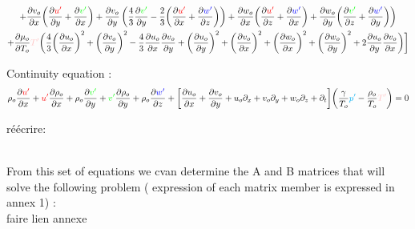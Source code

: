 \documentclass[ border=0pt, a4paper, 11pt]{article}
\numberwithin{equation}{section}
\numberwithin{equation}{section}
\renewcommand{\u}{\textcolor{red}{u'}}
\renewcommand{\v}{\textcolor{green}{v'}}
\newcommand{\w}{\textcolor{blue}{w'}}
\newcommand{\p}{\textcolor{cyan}{p'}}
\newcommand{\T}{\textcolor{pink}{T'}}
\begin{document}
\begin{multline}
 + \frac{\partial v_o}{\partial x} \bigg( \frac{\partial \u }{\partial y} + \frac{\partial \v }{\partial x} \bigg) + \frac{\partial v_o}{\partial y}\left(\frac{4}{3}\frac{\partial \v }{\partial y}-\frac{2}{3} \bigg(\frac{\partial \u }{\partial x}+\frac{\partial \w }{\partial z}\bigg)\right) 
 + \frac{\partial w_o}{\partial x} \bigg( \frac{\partial \u }{\partial z} + \frac{\partial \w }{\partial x} \bigg) + \frac{\partial w_o}{\partial y} \bigg( \frac{\partial \v }{\partial z} + \frac{\partial \w }{\partial y} \bigg)\bigg)\\
 + \frac{\partial  \mu_o }{\partial T_o} \T \bigg( \frac{4}{3}\bigg(\frac{\partial  u_o }{\partial x} \bigg)^2 + \bigg(\frac{\partial  v_o }{\partial y} \bigg)^2 - \frac{4}{3}\frac{\partial  u_o }{\partial x}\frac{\partial  v_o }{\partial y} + \bigg(\frac{\partial  u_o }{\partial y} \bigg)^2 + \bigg(\frac{\partial  v_o }{\partial x} \bigg)^2 + \bigg(\frac{\partial  w_o }{\partial x} \bigg)^2 + \bigg(\frac{\partial w_o }{\partial y} \bigg)^2 + 2 \frac{\partial  u_o }{\partial y}\frac{\partial  v_o }{\partial x}  \bigg) \bigg]\\
       \label{energy}
\end{multline}

Continuity equation :
  \begin{equation}  
 \rho_o\frac{\partial \u }{\partial x} + \u \frac{\partial \rho_o}{\partial x} + \rho_o\frac{\partial \v }{\partial y} + \v \frac{\partial \rho_o}{\partial y} + \rho_o\frac{\partial \w }{\partial z} +
%
\bigg[ \frac{\partial u_o}{\partial x}+ \frac{\partial v_o}{\partial y} + u_o \partial_x  + v_o \partial_y + w_o \partial_z +\partial_t \bigg]\bigg(\frac{\gamma}{T_o} \p - \frac{\rho_o}{T_o} \T \bigg) =0
       \label{continuity}
  \end{equation}  
  
  
  réécrire:



\\

From this set of equations we cvan determine the A and B matrices that will solve the following problem ( expression of each matrix member is expressed in annex 1) :\\
faire lien annexe 
\end{document}
